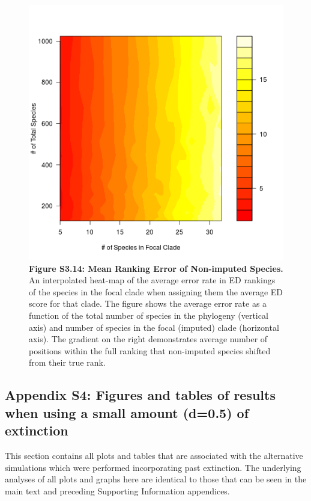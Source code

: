 \documentclass[10pt,english]{article}
\begin{document}
\begin{figure}[!ht]
  \center
  \includegraphics[width=.5\textwidth]{../figures/rankingError_remainingSpp.png}
  \caption*{\textbf{Figure S3.14: Mean Ranking Error of Non-imputed Species.}
  An interpolated heat-map of the average error rate in ED rankings of the
  species in the focal clade when assigning them the average ED score for that
  clade. The figure shows the average error rate as a function of the total
  number of species in the phylogeny (vertical axis) and number of species in
  the focal (imputed) clade (horizontal axis). The gradient on the right
  demonstrates average number of positions within the full ranking that
  non-imputed species shifted from their true rank.}
\end{figure}

\clearpage
\subsection*{Appendix S4: Figures and tables of results when using a small amount (d=0.5) of extinction}

This section contains all plots and tables that are associated with the
alternative simulations which were performed incorporating past extinction. The
underlying analyses of all plots and graphs here are identical to those that can
be seen in the main text and preceding Supporting Information appendices.  
\end{document}
